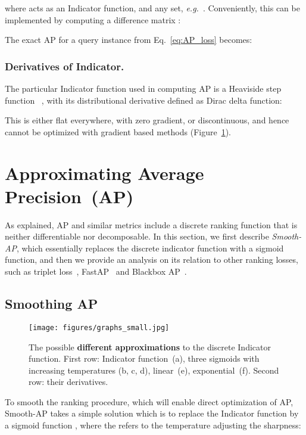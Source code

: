 \documentclass[runningheads]{llncs}
\providecommand{\eg}[0]{\emph{e.g.}}
\begin{document}
where  acts as an Indicator function, and  any set, \eg\ . 
Conveniently, this can be implemented by computing a difference matrix :



\noindent 
The exact AP for a query instance  from Eq.~\ref{eq:AP_loss} becomes:


\subsubsection{Derivatives of Indicator.}
The particular Indicator function used in computing AP is a Heaviside step function ~\cite{Qin10}, 
with its distributional derivative defined as Dirac delta function:
\begingroup\abovedisplayskip=6pt \belowdisplayskip=6pt

\endgroup
This is either flat everywhere, with zero gradient, or discontinuous, 
and hence cannot be optimized with gradient based methods (Figure~\ref{fig:sigmoid}).
 \label{sec:background}


\section{Approximating Average Precision~(AP)}
As explained, AP and similar metrics include a discrete ranking
function that is neither differentiable nor decomposable. 
In this section, we first describe {\em Smooth-AP}, 
which essentially replaces the discrete indicator function with a sigmoid function,
and then we provide an analysis on its relation to other 
ranking losses, such as triplet loss~\cite{HermansBeyer17Arxiv,Weinberger06},
FastAP~\cite{Cakir19} and Blackbox AP~\cite{Rolnek20optimizing}.

\subsection{Smoothing AP} 
\label{SmoothAPMethod}

\begin{figure}[t] 
\begin{center}
   \texttt{[image: figures/graphs\_small.jpg]}
\end{center}
\caption{\small{The possible \textbf{different approximations} to the discrete Indicator function. First row: Indicator function~(a), three sigmoids with increasing temperatures (b, c, d), linear~(e), exponential~(f). Second row: their derivatives.}}
\label{fig:sigmoid}
\end{figure}

To smooth the ranking procedure,  which will enable direct optimization of AP, Smooth-AP takes
a simple solution which is to replace the Indicator function  by a sigmoid function , where the  refers to the temperature adjusting the sharpness:
\end{document}
